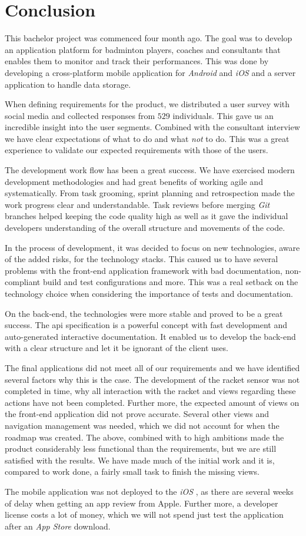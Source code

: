 \chapter{Conclusion}
This bachelor project was commenced four month ago.
The goal was to develop an application platform for badminton players, coaches and consultants that enables them to monitor and track their performances.
This was done by developing a cross-platform mobile application for \textit{Android} and \textit{iOS} and a server application to handle data storage.

When defining requirements for the product, we distributed a user survey with social media and collected responses from $529$ individuals.
This gave us an incredible insight into the user segments.
Combined with the consultant interview we have clear expectations of what to do and what \textit{not} to do.
This was a great experience to validate our expected requirements with those of the users.

The development work flow has been a great success.
We have exercised modern development methodologies and had great benefits of working agile and systematically.
From task grooming, sprint planning and retrospection made the work progress clear and understandable.
Task reviews before merging \textit{Git} branches helped keeping the code quality high as well as it gave the individual developers understanding of the overall structure and movements of the code.

In the process of development, it was decided to focus on new technologies, aware of the added risks, for the technology stacks.
This caused us to have several problems with the front-end application framework  with bad documentation, non-compliant build and test configurations and more.
This was a real setback on the technology choice when considering the importance of tests and documentation.

On the back-end, the technologies were more stable and proved to be a great success.
The \gls{api} specification  is a powerful concept with fast development and auto-generated interactive documentation.
It enabled us to develop the back-end with a clear structure and let it be ignorant of the client uses.

The final applications did not meet all of our requirements and we have identified several factors why this is the case.
The development of the racket sensor was not completed in time, why all interaction with the racket and views regarding these actions have not been completed.
Further more, the expected amount of views on the front-end application did not prove accurate. 
Several other views and navigation management was needed, which we did not account for when the roadmap was created.
The above, combined with to high ambitions made the product considerably less functional than the requirements, but we are still satisfied with the results.
We have made much of the initial work and it is, compared to work done, a fairly small task to finish the missing views.

The mobile application was not deployed to the \textit{iOS} , as there are several weeks of delay when getting an app review from Apple.
Further more, a developer license costs a lot of money, which we will not spend just test the application after an \textit{App Store} download.
